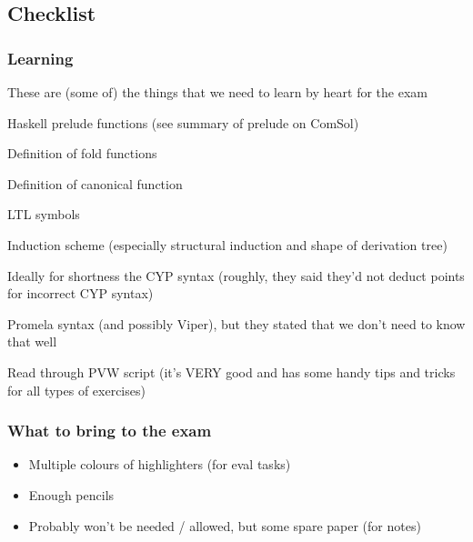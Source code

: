 \subsection{Checklist}
\subsubsection{Learning}
These are (some of) the things that we need to learn by heart for the exam
\begin{todolist}
    \item Haskell prelude functions (see summary of prelude on ComSol)
    \item Definition of fold functions
    \item Definition of canonical function
    \item LTL symbols
    \item Induction scheme (especially structural induction and shape of derivation tree)
    \item Ideally for shortness the CYP syntax (roughly, they said they'd not deduct points for incorrect CYP syntax)
    \item Promela syntax (and possibly Viper), but they stated that we don't need to know that well
    \item Read through PVW script (it's VERY good and has some handy tips and tricks for all types of exercises)
\end{todolist}

\subsubsection{What to bring to the exam}
\begin{itemize}[label=$\square$]
    \item Multiple colours of highlighters (for eval tasks)
    \item Enough pencils
    \item Probably won't be needed / allowed, but some spare paper (for notes)
\end{itemize}
